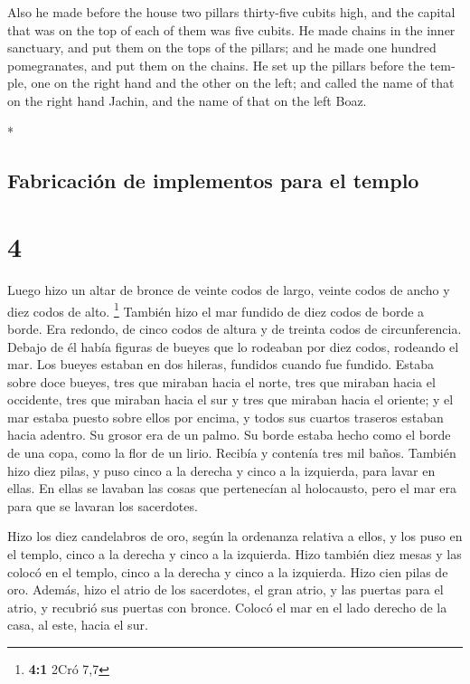 \begin{paracol}{2}
\begin{otherlanguage}{english}
 Also he made before the house two pillars thirty-five
cubits high, and the capital that was on the top of each of them was
five cubits.  He made chains in the inner sanctuary, and
put them on the tops of the pillars; and he made one hundred
pomegranates, and put them on the chains.  He set up the
pillars before the temple, one on the right hand and the other on the
left; and called the name of that on the right hand Jachin, and the name
of that on the left Boaz.

\end{otherlanguage}

\switchcolumn[0]*

\hypertarget{fabricaciuxf3n-de-implementos-para-el-templo}{%
\subsection{Fabricación de implementos para el
templo}\label{fabricaciuxf3n-de-implementos-para-el-templo}}

\hypertarget{section-6}{%
\section{4}\label{section-6}}

 Luego hizo un altar de bronce de veinte codos de largo,
veinte codos de ancho y diez codos de alto. \footnote{\textbf{4:1} 2Cró
  7,7}  También hizo el mar fundido de diez codos de borde
a borde. Era redondo, de cinco codos de altura y de treinta codos de
circunferencia.  Debajo de él había figuras de bueyes que
lo rodeaban por diez codos, rodeando el mar. Los bueyes estaban en dos
hileras, fundidos cuando fue fundido.  Estaba sobre doce
bueyes, tres que miraban hacia el norte, tres que miraban hacia el
occidente, tres que miraban hacia el sur y tres que miraban hacia el
oriente; y el mar estaba puesto sobre ellos por encima, y todos sus
cuartos traseros estaban hacia adentro.  Su grosor era de
un palmo. Su borde estaba hecho como el borde de una copa, como la flor
de un lirio. Recibía y contenía tres mil baños.  También
hizo diez pilas, y puso cinco a la derecha y cinco a la izquierda, para
lavar en ellas. En ellas se lavaban las cosas que pertenecían al
holocausto, pero el mar era para que se lavaran los sacerdotes.

 Hizo los diez candelabros de oro, según la ordenanza
relativa a ellos, y los puso en el templo, cinco a la derecha y cinco a
la izquierda.  Hizo también diez mesas y las colocó en el
templo, cinco a la derecha y cinco a la izquierda. Hizo cien pilas de
oro.  Además, hizo el atrio de los sacerdotes, el gran
atrio, y las puertas para el atrio, y recubrió sus puertas con bronce.
 Colocó el mar en el lado derecho de la casa, al este,
hacia el sur.


\end{paracol}
